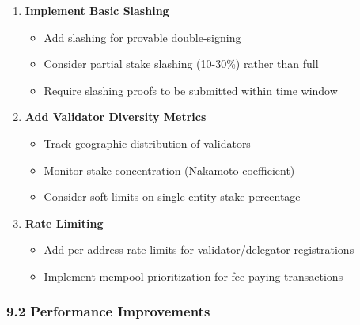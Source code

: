 \documentclass[
]{article}
\providecommand{\tightlist}{%
  \setlength{\itemsep}{0pt}\setlength{\parskip}{0pt}}
\begin{document}
\begin{enumerate}
\def\labelenumi{\arabic{enumi}.}
\item
  \textbf{Implement Basic Slashing}

  \begin{itemize}
  \tightlist
  \item
    Add slashing for provable double-signing
  \item
    Consider partial stake slashing (10-30\%) rather than full
  \item
    Require slashing proofs to be submitted within time window
  \end{itemize}
\item
  \textbf{Add Validator Diversity Metrics}

  \begin{itemize}
  \tightlist
  \item
    Track geographic distribution of validators
  \item
    Monitor stake concentration (Nakamoto coefficient)
  \item
    Consider soft limits on single-entity stake percentage
  \end{itemize}
\item
  \textbf{Rate Limiting}

  \begin{itemize}
  \tightlist
  \item
    Add per-address rate limits for validator/delegator registrations
  \item
    Implement mempool prioritization for fee-paying transactions
  \end{itemize}
\end{enumerate}

\subsubsection{9.2 Performance
Improvements}\label{92-performance-improvements}
\end{document}
